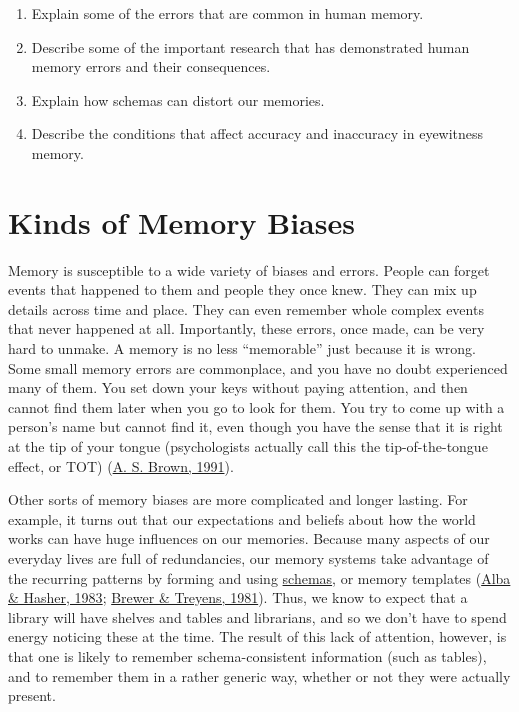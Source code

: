 \documentclass[
]{krantz}
\providecommand{\tightlist}{%
  \setlength{\itemsep}{0pt}\setlength{\parskip}{0pt}}
\begin{document}
\begin{enumerate}
\def\labelenumi{\arabic{enumi}.}
\tightlist
\item
  Explain some of the errors that are common in human memory.
\item
  Describe some of the important research that has demonstrated human memory errors and their consequences.
\item
  Explain how schemas can distort our memories.
\item
  Describe the conditions that affect accuracy and inaccuracy in eyewitness memory.
\end{enumerate}

\hypertarget{kinds-of-memory-biases}{%
\section{Kinds of Memory Biases}\label{kinds-of-memory-biases}}

Memory is susceptible to a wide variety of biases and errors. People can forget events that happened to them and people they once knew. They can mix up details across time and place. They can even remember whole complex events that never happened at all. Importantly, these errors, once made, can be very hard to unmake. A memory is no less ``memorable'' just
because it is wrong. Some small memory errors are commonplace, and you have no doubt
experienced many of them. You set down your keys without paying attention, and then cannot find them later when you go to look for them. You try to come up with a person's name but cannot find it, even though you have the sense that it is right at the tip of your tongue (psychologists actually call this the tip-of-the-tongue effect, or TOT) (\protect\hyperlink{ref-Brown1991}{A. S. Brown, 1991}).

Other sorts of memory biases are more complicated and longer lasting. For example, it turns out that our expectations and beliefs about how the world works can have huge influences on our memories. Because many aspects of our everyday lives are full of redundancies, our memory systems take advantage of the recurring patterns by forming and using \protect\hyperlink{schema}{schemas}, or memory templates (\protect\hyperlink{ref-Alba1983}{Alba \& Hasher, 1983}; \protect\hyperlink{ref-brewer1981role}{Brewer \& Treyens, 1981}). Thus, we know to expect that a library will have shelves and tables and librarians, and so we don't have to spend energy noticing these at the time. The result of this lack of attention, however, is that one is likely to remember schema-consistent information (such as tables), and to remember them in a rather generic way, whether or not they were actually present.
\end{document}
